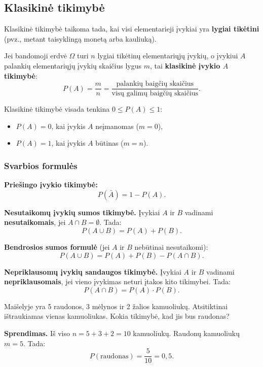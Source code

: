 \subsection{Klasikinė tikimybė}

Klasikinė tikimybė taikoma tada, kai visi elementarieji įvykiai yra \textbf{lygiai tikėtini} (pvz., metant taisyklingą monetą arba kauliuką).

\begin{definition}
Jei bandomoji erdvė $\Omega$ turi $n$ lygiai tikėtinų elementariųjų įvykių, o įvykiui $A$ palankių elementariųjų įvykių skaičius lygus $m$, tai \textbf{klasikinė įvykio $A$ tikimybė}:
\[
P(A) = \frac{m}{n} = \frac{\text{palankių baigčių skaičius}}{\text{visų galimų baigčių skaičius}}.
\]
\end{definition}

\begin{remark}
Klasikinė tikimybė visada tenkina $0 \leq P(A) \leq 1$:
\begin{itemize}
    \item $P(A) = 0$, kai įvykis $A$ neįmanomas ($m = 0$),
    \item $P(A) = 1$, kai įvykis $A$ būtinas ($m = n$).
\end{itemize}
\end{remark}

\subsubsection*{Svarbios formulės}

\textbf{Priešingo įvykio tikimybė:}
\[
P(\bar{A}) = 1 - P(A).
\]

\textbf{Nesutaikomų įvykių sumos tikimybė.} Įvykiai $A$ ir $B$ vadinami \textbf{nesutaikomais}, jei $A \cap B = \emptyset$. Tada:
\[
P(A \cup B) = P(A) + P(B).
\]

\textbf{Bendrosios sumos formulė} (jei $A$ ir $B$ nebūtinai nesutaikomi):
\[
P(A \cup B) = P(A) + P(B) - P(A \cap B).
\]

\textbf{Nepriklausomų įvykių sandaugos tikimybė.} Įvykiai $A$ ir $B$ vadinami \textbf{nepriklausomais}, jei vieno įvykimas neturi įtakos kito tikimybei. Tada:
\[
P(A \cap B) = P(A) \cdot P(B).
\]

\begin{example}
Maišelyje yra 5 raudonos, 3 mėlynos ir 2 žalios kamuoliukų. Atsitiktinai ištraukiamas vienas kamuoliukas. Kokia tikimybė, kad jis bus raudonas?

\textbf{Sprendimas.} Iš viso $n = 5 + 3 + 2 = 10$ kamuoliukų. Raudonų kamuoliukų $m = 5$. Tada:
\[
P(\text{raudonas}) = \frac{5}{10} = 0{,}5.
\]
\end{example}


